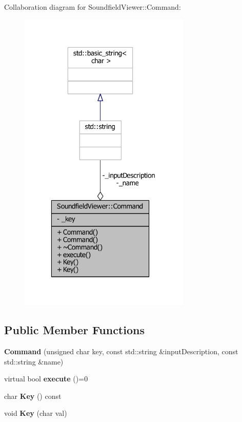 Collaboration diagram for Soundfield\-Viewer\-:\-:Command\-:\nopagebreak
\begin{figure}[H]
\begin{center}
\leavevmode
\includegraphics[width=232pt]{d9/da6/classSoundfieldViewer_1_1Command__coll__graph}
\end{center}
\end{figure}
\subsection*{Public Member Functions}
\begin{DoxyCompactItemize}
\item 
{\bfseries Command} (unsigned char key, const std\-::string \&input\-Description, const std\-::string \&name)\label{classSoundfieldViewer_1_1Command_a5ec2707ec00b0024f110b9a78d9128cf}

\item 
virtual bool {\bfseries execute} ()=0\label{classSoundfieldViewer_1_1Command_afbc475b6400222424ebb9368af017966}

\item 
char {\bfseries Key} () const \label{classSoundfieldViewer_1_1Command_a8e26d9d8e7553ec0b90297b96a1e77b0}

\item 
void {\bfseries Key} (char val)\label{classSoundfieldViewer_1_1Command_a4119f51b967c9e867fdd164b81d9e654}

\end{DoxyCompactItemize}
